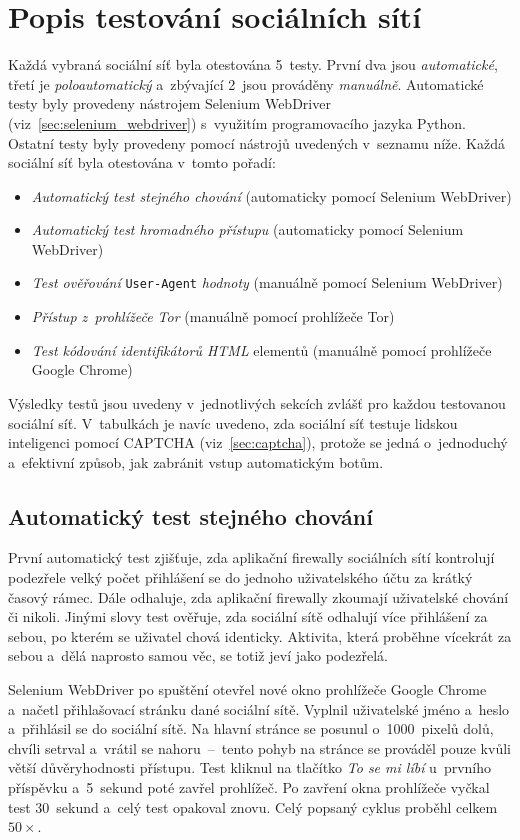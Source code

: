 \section{Popis testování sociálních sítí}
Každá vybraná sociální síť byla otestována 5~testy. První dva jsou \textit{automatické}, třetí je \textit{poloautomatický} a~zbývající 2~jsou prováděny \textit{manuálně}. Automatické testy byly provedeny nástrojem Selenium WebDriver (viz~\ref{sec:selenium_webdriver}) s~využitím programovacího jazyka Python. Ostatní testy byly provedeny pomocí nástrojů uvedených v~seznamu níže. Každá sociální síť byla otestována v~tomto pořadí: 
\begin{itemize}
  \item \textit{Automatický test stejného chování} (automaticky pomocí Selenium WebDriver)
  \item \textit{Automatický test hromadného přístupu} (automaticky pomocí Selenium WebDriver)
  \item \textit{Test ověřování} \texttt{User-Agent} \textit{hodnoty} (manuálně pomocí Selenium WebDriver)
  \item \textit{Přístup z~prohlížeče Tor} (manuálně pomocí prohlížeče Tor)
  \item \textit{Test kódování identifikátorů HTML} elementů (manuálně pomocí prohlížeče Google Chrome)
\end{itemize}

\noindent
Výsledky testů jsou uvedeny v~jednotlivých sekcích zvlášť pro každou testovanou sociální síť. V~tabulkách je navíc uvedeno, zda sociální síť testuje lidskou inteligenci pomocí CAPTCHA (viz~\ref{sec:captcha}), protože se jedná o~jednoduchý a~efektivní způsob, jak zabránit vstup automatickým botům.

\subsection*{Automatický test stejného chování}
\label{sec:repeated_behaviour}
První automatický test zjišťuje, zda aplikační firewally sociálních sítí kontrolují podezřele velký počet přihlášení se do jednoho uživatelského účtu za krátký časový rámec. Dále odhaluje, zda aplikační firewally zkoumají uživatelské chování či nikoli. Jinými slovy test ověřuje, zda sociální sítě odhalují více přihlášení za sebou, po kterém se uživatel chová identicky. Aktivita, která proběhne vícekrát za sebou a~dělá naprosto samou věc, se totiž jeví jako podezřelá.

Selenium WebDriver po spuštění otevřel nové okno prohlížeče Google Chrome a~načetl přihlašovací stránku dané sociální sítě. Vyplnil uživatelské jméno a~heslo a~přihlásil se do sociální sítě. Na hlavní stránce se posunul o~1000~pixelů dolů, chvíli setrval a~vrátil se nahoru~--~tento pohyb na stránce se prováděl pouze kvůli větší důvěryhodnosti přístupu. Test kliknul na tlačítko \textit{To se mi líbí} u~prvního příspěvku a~5~sekund poté zavřel prohlížeč. Po zavření okna prohlížeče vyčkal test 30~sekund a~celý test opakoval znovu. Celý popsaný cyklus proběhl celkem $50\times$.


